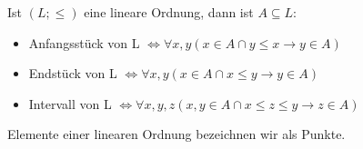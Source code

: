 \documentclass[12pt,a4paper]{article} %
\begin{document}
	Ist $(L; \le)$ eine lineare Ordnung, dann ist $A \subseteq L$:
	\begin{itemize}
		\item Anfangsstück von L $\Leftrightarrow \forall x, y (x \in A \cap y \le x  \rightarrow y \in A)$ 
		\item Endstück von L $\Leftrightarrow \forall x, y (x \in A \cap x \le y  \rightarrow y \in A)$ 
		\item Intervall von L $\Leftrightarrow \forall x, y, z (x, y \in A \cap x \le z \le y  \rightarrow z \in A)$ 
	\end{itemize}
	Elemente einer linearen Ordnung bezeichnen wir als Punkte.
\end{document}
